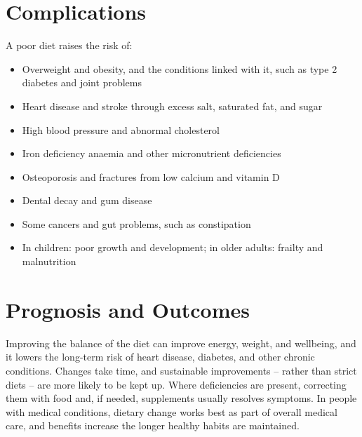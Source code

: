 \section*{Complications}
A poor diet raises the risk of:

\begin{itemize}
    \item Overweight and obesity, and the conditions linked with it, such as type 2 diabetes and joint problems
    \item Heart disease and stroke through excess salt, saturated fat, and sugar
    \item High blood pressure and abnormal cholesterol
    \item Iron deficiency anaemia and other micronutrient deficiencies
    \item Osteoporosis and fractures from low calcium and vitamin D
    \item Dental decay and gum disease
    \item Some cancers and gut problems, such as constipation
    \item In children: poor growth and development; in older adults: frailty and malnutrition
\end{itemize}

\section*{Prognosis and Outcomes}
Improving the balance of the diet can improve energy, weight, and wellbeing, and it lowers the long-term risk of heart disease, diabetes, and other chronic conditions. Changes take time, and sustainable improvements -- rather than strict diets -- are more likely to be kept up. Where deficiencies are present, correcting them with food and, if needed, supplements usually resolves symptoms. In people with medical conditions, dietary change works best as part of overall medical care, and benefits increase the longer healthy habits are maintained.

